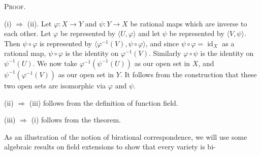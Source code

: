 {\smallskip
\noindent\textsc{Proof.}

(i) $\Rightarrow$ (ii). Let $\varphi\colon X\to Y$ and $\psi\colon Y\to X$ be rational maps which are inverse to each other. Let $\varphi$ be represented by $\langle U,\varphi\rangle$ and let $\psi$ be represented by $\langle V,\psi\rangle$. Then $\psi\circ\varphi$ is represented by $\langle\varphi^{-1}(V),\psi\circ\varphi\rangle$, and since $\psi\circ\varphi=\operatorname{id}_X$ as a rational map, $\psi\circ\varphi$ is the identity on $\varphi^{-1}(V)$. Similarly $\varphi\circ\psi$ is the identity on $\psi^{-1}(U)$. We now take $\varphi^{-1}(\psi^{-1}(U))$ as our open set in $X$, and $\psi^{-1}(\varphi^{-1}(V))$ as our open set in $Y$. It follows from the construction that these two open sets are isomorphic via $\varphi$ and $\psi$.

(ii) $\Rightarrow$ (iii) follows from the definition of function field.

(iii) $\Rightarrow$ (i) follows from the theorem.

\smallskip
As an illustration of the notion of birational correspondence, we will use some algebraic results on field extensions to show that every variety is bi-%
}
